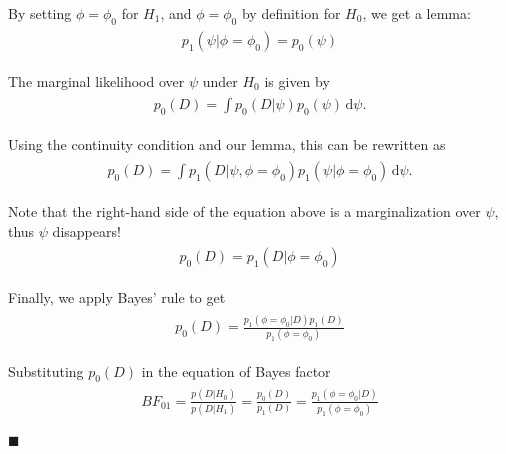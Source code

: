 \documentclass[paper=a4, fontsize=11pt]{scrartcl} %
\numberwithin{equation}{section} %
\numberwithin{figure}{section} %
\numberwithin{table}{section} %
\begin{document}
By setting $\phi = \phi_0$ for $H_1$, and $\phi = \phi_0$ by definition for $H_0$, we get a lemma:
\begin{align}
\begin{split}
p_1( \psi | \phi = \phi_0) = p_0(\psi)
\end{split}
\end{align}

The marginal likelihood over $\psi$ under $H_0$ is given by
\begin{align}
\begin{split}
p_0(D) = \int \! p_0(D | \psi) p_0(\psi) \, \mathrm{d}\psi.
\end{split}
\end{align}

Using the continuity condition and our lemma, this can be rewritten as
\begin{align}
\begin{split}
p_0(D) = \int \! p_1(D | \psi, \phi=\phi_0) p_1(\psi | \phi = \phi_0) \, \mathrm{d}\psi.
\end{split}
\end{align}

Note that the right-hand side of the equation above is a marginalization over $\psi$, thus $\psi$ disappears!
\begin{align}
\begin{split}
p_0(D) = p_1(D | \phi = \phi_0)
\end{split}
\end{align}

Finally, we apply Bayes' rule to get
 \begin{align}
\begin{split}
p_0(D) = \frac{p_1(\phi = \phi_0 | D) p_1(D)}{p_1(\phi = \phi_0)} 
\end{split}
\end{align}

Substituting $p_0(D)$ in the equation of Bayes factor
\begin{align}
\begin{split}
BF_{01} = \frac{p(D|H_0)}{p(D|H_1)} =\frac{p_0(D)}{p_1(D)} = \frac{p_1(\phi = \phi_0 | D)}{p_1(\phi = \phi_0)}
\end{split}
\end{align}

$\blacksquare$

\end{document}
